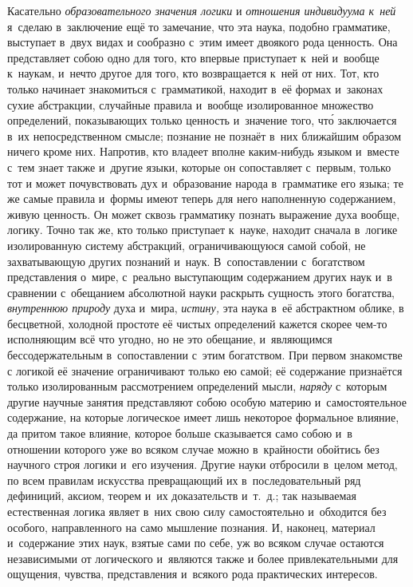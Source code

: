 Касательно {\em образовательного значения логики} и
{\em отношения индивидуума к~ней} я~сделаю в~заключение
ещё то замечание, что эта наука, подобно грамматике, выступает в~двух видах
и сообразно с~этим имеет двоякого рода ценность. Она представляет собою
одно для того, кто впервые приступает к~ней и~вообще к~наукам, и~нечто
другое для того, кто возвращается к~ней от них. Тот, кто только начинает
знакомиться с~грамматикой, находит в~её формах и~законах сухие абстракции,
случайные правила и~вообще изолированное множество определений,
показывающих только ценность и~значение того, чт\'{о} заключается в~их
непосредственном смысле; познание не познаёт в~них ближайшим образом ничего
кроме них. Напротив, кто владеет вполне каким-нибудь языком и~вместе с~тем
знает также и~другие языки, которые он сопоставляет с~первым, только тот и
может почувствовать дух и~образование народа в~грамматике его языка; те же
самые правила и~формы имеют теперь для него наполненную содержанием, живую
ценность. Он может сквозь грамматику познать выражение духа вообще, логику.
Точно так же, кто только приступает к~науке, находит сначала в~логике
изолированную систему абстракций, ограничивающуюся самой собой, не
захватывающую других познаний и~наук. В~сопоставлении с~богатством
представления о~мире, с~реально выступающим содержанием других наук и~в
сравнении с~обещанием абсолютной науки раскрыть сущность этого богатства,
{\em внутреннюю природу} духа и~мира,
{\em истину,} эта наука в~её абстрактном облике, в
бесцветной, холодной простоте её чистых определений кажется скорее чем-то
исполняющим всё что угодно, но не это обещание, и~являющимся
бессодержательным в~сопоставлении с~этим богатством. При первом знакомстве
с логикой её значение ограничивают только ею самой; её содержание
признаётся только изолированным рассмотрением определений мысли,
{\em наряду} с~которым другие научные занятия
представляют собою особую материю и~самостоятельное содержание, на которые
логическое имеет лишь некоторое формальное влияние, да притом такое
влияние, которое больше сказывается само собою и~в отношении которого уже
во всяком случае можно в~крайности обойтись без научного строя логики и~его
изучения. Другие науки отбросили в~целом метод, по всем правилам искусства
превращающий их в~последовательный ряд дефиниций, аксиом, теорем и~их
доказательств и~т.~д.; так называемая естественная логика являет в~них свою
силу самостоятельно и~обходится без особого, направленного на само мышление
познания. И, наконец, материал и~содержание этих наук, взятые сами по себе,
уж во всяком случае остаются независимыми от логического и~являются также и
более привлекательными для ощущения, чувства, представления и~всякого рода
практических интересов.

